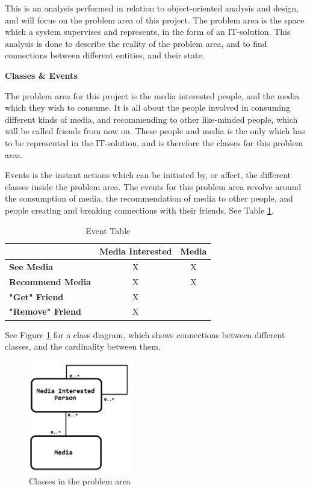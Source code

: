 This is an analysis performed in relation to object-oriented analysis and design, and will focus on the problem area of this project. The problem area is the space which a system supervises and represents, in the form of an IT-solution. This analysis is done to describe the reality of the problem area, and to find connections between different entities, and their state.

\textbf{Classes \& Events}

The problem area for this project is  the media interested people, and the media which they wish to consume. It is all about the people involved in consuming different kinds of media, and recommending to other like-minded people, which will be called friends from now on. These people and media is the only which has to be represented in the IT-solution, and is therefore the classes for this problem area.

Events is the instant actions which can be initiated by, or affect, the different classes inside the problem area. The events for this problem area revolve around the consumption of media, the recommendation of media to other people, and people creating and breaking connections with their friends. See Table \ref{EventTable}.

\begin{table}[htb]
\centering
\begin{tabular}{|l|c|c|} \hline
	  & \textbf{Media Interested} & \textbf{Media} \\ \hline
	\textbf{See Media} & X & X \\ \hline
	\textbf{Recommend Media} & X & X \\ \hline
	\textbf{"Get" Friend} & X &  \\ \hline
	\textbf{"Remove" Friend} & X &  \\ \hline
\end{tabular}
\caption{Event Table}
\label{EventTable}
\end{table}

See Figure \ref{ClassDiagram} for a class diagram, which shows connections between different classes, and the cardinality between them.

\begin{figure}[htb]
\centering
\includegraphics[width=0.4\textwidth]{Images/classdiagram.png}
\caption{Classes in the problem area}
\label{ClassDiagram}
\end{figure}

